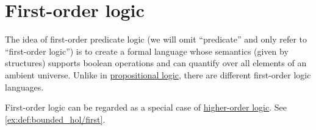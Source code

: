 \section{First-order logic}\label{sec:first_order_logic}

The idea of first-order predicate logic (we will omit \enquote{predicate} and only refer to \enquote{first-order logic}) is to create a formal language whose semantics (given by structures) supports boolean operations and can quantify over all elements of an ambient universe. Unlike in \hyperref[sec:propositional_logic]{propositional logic}, there are different first-order logic languages.

\begin{definition}\label{def:first_order_logic}\mimprovised
\end{definition}
\begin{comments}
  \item First-order logic can be regarded as a special case of \hyperref[def:higher_order_logic]{higher-order logic}. See \cref{ex:def:bounded_hol/first}.
\end{comments}

